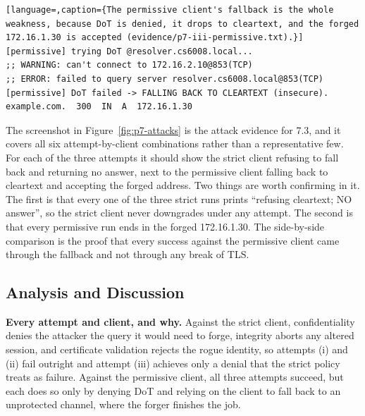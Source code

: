 \documentclass[11pt]{article}
\begin{document}
\begin{lstlisting}[language=,caption={The permissive client's fallback is the whole weakness, because DoT is denied, it drops to cleartext, and the forged 172.16.1.30 is accepted (evidence/p7-iii-permissive.txt).}]
[permissive] trying DoT @resolver.cs6008.local...
;; WARNING: can't connect to 172.16.2.10@853(TCP)
;; ERROR: failed to query server resolver.cs6008.local@853(TCP)
[permissive] DoT failed -> FALLING BACK TO CLEARTEXT (insecure).
example.com.  300  IN  A  172.16.1.30
\end{lstlisting}


The screenshot in Figure~\ref{fig:p7-attacks} is the attack evidence for 7.3, and
it covers all six attempt-by-client combinations rather than a representative few.
For each of the three attempts it should show the strict client refusing to fall
back and returning no answer, next to the permissive client falling back to
cleartext and accepting the forged address. Two things are worth confirming in it.
The first is that every one of the three strict runs prints ``refusing cleartext;
NO answer'', so the strict client never downgrades under any attempt. The second is
that every permissive run ends in the forged 172.16.1.30. The side-by-side
comparison is the proof that
every success against the permissive client came through the fallback and not
through any break of TLS.

\subsection{Analysis and Discussion}

\textbf{Every attempt and client, and why.} Against the strict client,
confidentiality denies the attacker the query it would need to forge, integrity
aborts any altered session, and certificate validation rejects the rogue identity,
so attempts (i) and (ii) fail outright and attempt (iii) achieves only a denial
that the strict policy treats as failure. Against the permissive client, all three
attempts succeed, but each does so only by denying DoT and relying on the client to
fall back to an unprotected channel, where the forger finishes the job.
\end{document}
